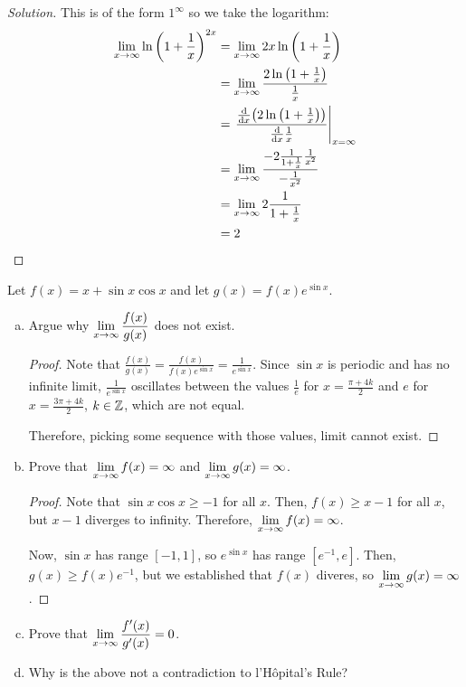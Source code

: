 \begin{enumerate}[(a)]
        \begin{proof}[Solution]
          This is of the form $1^\infty$ so we take the logarithm:
          \begin{align*}
            \lim_{x\to\infty} \ln \left(1 + \frac{1}{x}\right)^{2x}
             & = \lim_{x\to\infty} 2x\ln \left(1 + \frac{1}{x}\right)                            \\
             & = \lim_{x\to\infty} \frac{2\ln \left(1 + \frac{1}{x}\right)}{\frac1x}             \\
             & = \left.\frac{\dv{x}(2\ln \left(1 + \frac{1}{x}\right))}{\dv{x}\frac1x}\right|_{x=\infty}  \\
             & = \lim_{x\to\infty} \frac{-2\frac{1}{1+\frac{1}{x}}\frac{1}{x^2}}{-\frac{1}{x^2}} \\
             & = \lim_{x\to\infty} 2\frac{1}{1+\frac{1}{x}}                                      \\
             & = 2 \qedhere
          \end{align*}
        \end{proof}
\end{enumerate}


\question Let $f(x) = x + \sin x \cos x$ and let $g(x) = f(x)e^{\sin x}$.
\begin{enumerate}[(a)]
  \item Argue why $\displaystyle\lim_{x\to\infty}\frac{f(x)}{g(x)}$ does not exist.
        \begin{proof}
          Note that $\frac{f(x)}{g(x)} = \frac{f(x)}{f(x)e^{\sin x}} = \frac{1}{e^{\sin x}}$.
          Since $\sin x$ is periodic and has no infinite limit,
          $\frac{1}{e^{\sin x}}$ oscillates between the values
          $\frac{1}{e}$ for $x = \frac{\pi+4k}{2}$ and $e$ for $x = \frac{3\pi+4k}{2}$, $k\in\mathbb{Z}$,
          which are not equal.

          Therefore, picking some sequence with those values, limit cannot exist.
        \end{proof}

  \item Prove that $\displaystyle\lim_{x\to\infty}f(x) = \infty$ and $\displaystyle\lim_{x\to\infty}g(x) = \infty$.
        \begin{proof}
          Note that $\sin x\cos x \geq -1$ for all $x$.
          Then, $f(x) \geq x - 1$ for all $x$, but $x-1$ diverges to infinity.
          Therefore, $\displaystyle\lim_{x\to\infty}f(x) = \infty$.

          Now, $\sin x$ has range $[-1,1]$, so $e^{\sin x}$ has range $[e^{-1},e]$.
          Then, $g(x) \geq f(x)e^{-1}$, but we established that $f(x)$ diveres, so $\displaystyle\lim_{x\to\infty}g(x) = \infty$.
        \end{proof}
  \item Prove that $\displaystyle\lim_{x\to\infty}\frac{f'(x)}{g'(x)} = 0$.
  \item Why is the above not a contradiction to l'Hôpital's Rule?
\end{enumerate}

